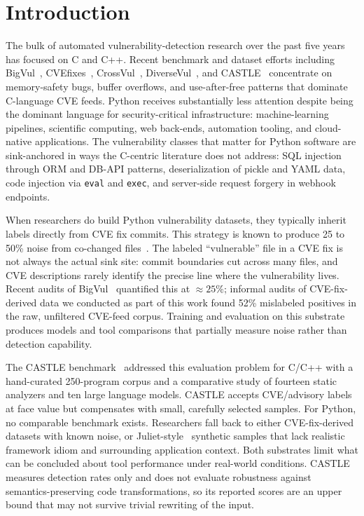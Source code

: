 \section{Introduction}
\label{sec:introduction}

The bulk of automated vulnerability-detection research over the past
five years has focused on C and C++. Recent benchmark and dataset
efforts including BigVul~\cite{bigvul},
CVEfixes~\cite{cvefixes}, CrossVul~\cite{crossvul},
DiverseVul~\cite{diversevul}, and CASTLE~\cite{castle}
concentrate on memory-safety bugs, buffer overflows, and
use-after-free patterns that dominate C-language CVE feeds. Python
receives substantially less attention despite being the dominant
language for security-critical infrastructure: machine-learning
pipelines, scientific computing, web back-ends, automation tooling,
and cloud-native applications. The vulnerability classes that matter
for Python software are sink-anchored in ways the C-centric literature
does not address: SQL injection through ORM and DB-API patterns,
deserialization of pickle and YAML data, code injection via
\texttt{eval} and \texttt{exec}, and server-side request forgery in
webhook endpoints.

When researchers do build Python vulnerability datasets, they
typically inherit labels directly from CVE fix commits. This strategy
is known to produce 25 to 50\% noise from co-changed
files~\cite{croft}. The labeled ``vulnerable'' file in a CVE fix
is not always the actual sink site: commit boundaries cut across many
files, and CVE descriptions rarely identify the precise line where the
vulnerability lives. Recent audits of BigVul~\cite{croft}
quantified this at $\approx 25\%$; informal audits of CVE-fix-derived
data we conducted as part of this work found 52\% mislabeled positives
in the raw, unfiltered CVE-feed corpus. Training and evaluation on
this substrate produces models and tool comparisons that partially
measure noise rather than detection capability.

The CASTLE benchmark~\cite{castle} addressed this evaluation
problem for C/C++ with a hand-curated 250-program corpus and a
comparative study of fourteen static analyzers and ten large language
models. CASTLE accepts CVE/advisory labels at face value but
compensates with small, carefully selected samples. For Python, no
comparable benchmark exists. Researchers fall back to either
CVE-fix-derived datasets with known noise, or
Juliet-style~\cite{juliet} synthetic samples that lack
realistic framework idiom and surrounding application context. Both
substrates limit what can be concluded about tool performance under
real-world conditions. CASTLE measures detection rates only and does
not evaluate robustness against semantics-preserving code
transformations, so its reported scores are an upper bound that may
not survive trivial rewriting of the input.

